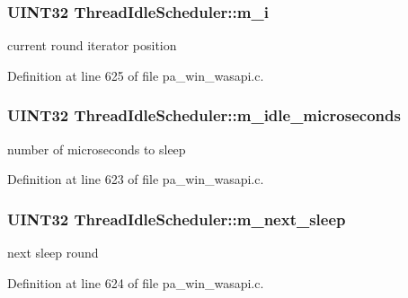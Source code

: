 \subsubsection[{\texorpdfstring{m\+\_\+i}{m_i}}]{\setlength{\rightskip}{0pt plus 5cm}U\+I\+N\+T32 Thread\+Idle\+Scheduler\+::m\+\_\+i}\hypertarget{struct_thread_idle_scheduler_ab2c6c2a4a836798d7bfc33c70be3582b}{}\label{struct_thread_idle_scheduler_ab2c6c2a4a836798d7bfc33c70be3582b}


current round iterator position 



Definition at line 625 of file pa\+\_\+win\+\_\+wasapi.\+c.

\subsubsection[{\texorpdfstring{m\+\_\+idle\+\_\+microseconds}{m_idle_microseconds}}]{\setlength{\rightskip}{0pt plus 5cm}U\+I\+N\+T32 Thread\+Idle\+Scheduler\+::m\+\_\+idle\+\_\+microseconds}\hypertarget{struct_thread_idle_scheduler_a26bd9b0fcd08da6394b1b0a577b69536}{}\label{struct_thread_idle_scheduler_a26bd9b0fcd08da6394b1b0a577b69536}


number of microseconds to sleep 



Definition at line 623 of file pa\+\_\+win\+\_\+wasapi.\+c.

\subsubsection[{\texorpdfstring{m\+\_\+next\+\_\+sleep}{m_next_sleep}}]{\setlength{\rightskip}{0pt plus 5cm}U\+I\+N\+T32 Thread\+Idle\+Scheduler\+::m\+\_\+next\+\_\+sleep}\hypertarget{struct_thread_idle_scheduler_aa54f62fb37734538f6750a0a751e3339}{}\label{struct_thread_idle_scheduler_aa54f62fb37734538f6750a0a751e3339}


next sleep round 



Definition at line 624 of file pa\+\_\+win\+\_\+wasapi.\+c.


